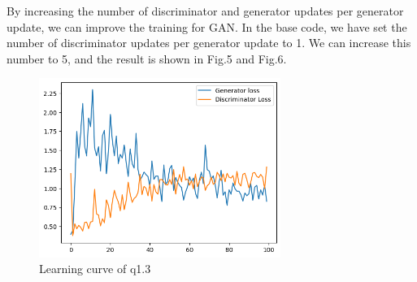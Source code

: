 \documentclass[a4paper]{article}
\theoremstyle{definition}
\newenvironment{soln}{
	\leavevmode\color{blue}\ignorespaces
}{}
\begin{document}
\begin{enumerate} [label=(\alph*)]
		\begin{soln} 
			By increasing the number of discriminator and generator updates per generator update, we can improve the training for GAN. In the base code, we have set the number of discriminator updates per generator update to 1. We can increase this number to 5, and the result is shown in Fig.5 and Fig.6.
			\begin{figure}[H]
				\centering
				\includegraphics[width=0.7\textwidth]{gan_q3_loss.png}
				\caption{Learning curve of q1.3}
				\label{fig:gan_q1_loss}
			\end{figure}
			

\end{soln}
\end{enumerate}
\end{document}
